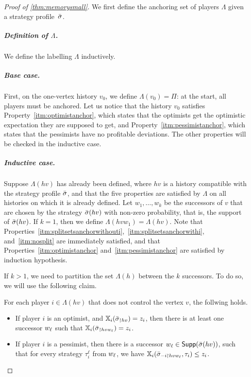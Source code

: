 \begin{proof}[Proof of \cref{thm:memorysmall}]
We first define the anchoring set of players $\Lambda$ given a strategy profile~${\bar{\sigma}}$.
\subparagraph*{Definition of $\Lambda$.}

\finiteMemAbstraction*

\begin{claimproof}
    We define the labelling $\Lambda$ inductively. 

    \subparagraph*{Base case.}
    First, on the one-vertex history $v_0$, we define $\Lambda(v_0) = \Pi$: at the start, all players must be anchored.
    Let us notice that the history $v_0$ satisfies Property~\ref{itm:optimistanchor}, which states that the optimists get the optimistic expectation they are supposed to get, and Property~\ref{itm:pessimistanchor}, which states that the pessimists have no profitable deviations.
    The other properties will be checked in the inductive case.

    \subparagraph*{Inductive case.}
    Suppose $\Lambda(hv)$ has already been defined, where $hv$ is a history compatible with the strategy profile ${\bar{\sigma}}$, and that the five properties are satisfied by $\Lambda$ on all histories on which it is already defined.
    Let $w_1, \dots, w_k$ be the successors of $v$ that are chosen by the strategy ${\bar{\sigma}}(hv)$ with non-zero probability, that is, the support of ${\bar{\sigma}}(hv)$.
    If $k=1$, then we define $\Lambda(hvw_1) = \Lambda(hv)$.
    Note that Properties~\ref{itm:splitsetsanchorwithouti},~\ref{itm:splitsetsanchorwithi}, and~\ref{itm:nosplit} are immediately satisfied, and that Properties~\ref{itm:optimistanchor} and~\ref{itm:pessimistanchor} are satisfied by induction hypothesis.
    
    If $k>1$, we need to partition the set $\Lambda(h)$ between the $k$ successors.
    To do so, we will use the following claim.
    
    \begin{claim}\label{claim:successorAnchor}
    For each player $i \in \Lambda(hv)$ that does not control the vertex $v$, the follwing holds.
    \begin{itemize}
        \item If player $i$ is an optimist, and $\mathbb{X}_i({\bar{\sigma}}_{\upharpoonright hv}) = z_i$, then there is at least one successor $w_\ell$ such that $\mathbb{X}_i({\bar{\sigma}}_{\upharpoonright hvw_\ell}) = z_i$.
    
        \item If player $i$ is a pessimist, then there is a successor $w_\ell \in \mathsf{Supp}({\bar{\sigma}}(hv))$, such that for every  strategy $\tau_i^\ell$ from $w_\ell$, we have $\mathbb{X}_i({\bar{\sigma}}_{-i\upharpoonright hvw_\ell}, \tau_i) \leq z_i$.
    \end{itemize}
    \end{claim}
    

\end{claimproof}
\end{proof}
